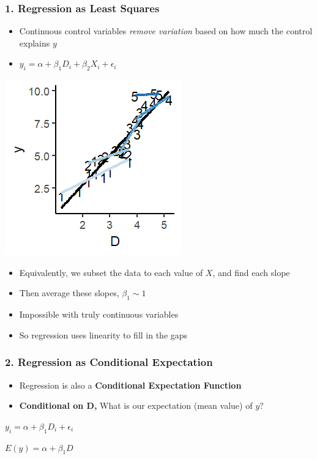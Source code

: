 \documentclass[xcolor=x11names,compress]{beamer}\usepackage[]{graphicx}\usepackage[]{color}
\makeatletter
\def\maxwidth{ %
  \ifdim\Gin@nat@width>\linewidth
    \linewidth
  \else
    \Gin@nat@width
  \fi
}
\newenvironment{knitrout}{}{} %
\renewcommand{\(}{\begin{columns}}
\renewcommand{\)}{\end{columns}}
\newcommand{\<}[1]{\begin{column}{#1}}
\renewcommand{\>}{\end{column}}
\makeatother
\begin{document}
\begin{frame}
\frametitle{1. Regression as Least Squares}
\begin{itemize}
\item Continuous control variables \textit{remove variation} based on how much the control explains $y$
\item $y_i = \alpha + \beta_1 D_i + \beta_2 X_i + \epsilon_i$
\end{itemize}
\begin{multicols}{2}
\begin{knitrout}
\color{fgcolor}
\includegraphics[width=\maxwidth]{figure/graph_ols_control4-1} 

\end{knitrout}
\columnbreak

\begin{itemize}
\item Equivalently, we subset the data to each value of $X$, and find each slope
\pause
\item Then average these slopes, $\beta_1 \sim 1$
\pause
\item Impossible with truly continuous variables
\pause
\item So regression uses linearity to fill in the gaps
\end{itemize}
\end{multicols}
\end{frame}

\begin{frame}
\frametitle{2. Regression as Conditional Expectation}
\begin{itemize}
\item Regression is also a \textbf{Conditional Expectation Function}
\pause
\item \textbf{Conditional on D,} What is our expectation (mean value) of $y$?
\end{itemize}
\small
\begin{center}
\item $y_i = \alpha + \beta_1 D_i + \epsilon_i$ \\
\pause
\item $E(y) = \alpha + \beta_1 D$ \\
\end{center}
\normalsize
\end{frame}
\end{document}
